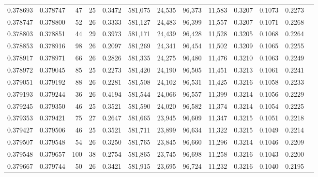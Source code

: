 \begin{tabular}{rrrrrrrrrrrrr}
0.378693 & 0.378747 &    47 &  25 &                                     0.3472 & 581,075 &  24,535 &  96,373 &  11,583 & 0.3207 & 0.1073 & 0.2273 \\
0.378747 & 0.378800 &    52 &  26 &                                     0.3333 & 581,127 &  24,483 &  96,399 &  11,557 & 0.3207 & 0.1071 & 0.2268 \\
0.378803 & 0.378851 &    44 &  29 &                                     0.3973 & 581,171 &  24,439 &  96,428 &  11,528 & 0.3205 & 0.1068 & 0.2264 \\
0.378853 & 0.378916 &    98 &  26 &                                     0.2097 & 581,269 &  24,341 &  96,454 &  11,502 & 0.3209 & 0.1065 & 0.2255 \\
0.378917 & 0.378971 &    66 &  26 &                                     0.2826 & 581,335 &  24,275 &  96,480 &  11,476 & 0.3210 & 0.1063 & 0.2249 \\
0.378972 & 0.379045 &    85 &  25 &                                     0.2273 & 581,420 &  24,190 &  96,505 &  11,451 & 0.3213 & 0.1061 & 0.2241 \\
0.379051 & 0.379192 &    88 &  26 &                                     0.2281 & 581,508 &  24,102 &  96,531 &  11,425 & 0.3216 & 0.1058 & 0.2233 \\
0.379193 & 0.379244 &    36 &  26 &                                     0.4194 & 581,544 &  24,066 &  96,557 &  11,399 & 0.3214 & 0.1056 & 0.2229 \\
0.379245 & 0.379350 &    46 &  25 &                                     0.3521 & 581,590 &  24,020 &  96,582 &  11,374 & 0.3214 & 0.1054 & 0.2225 \\
0.379353 & 0.379421 &    75 &  27 &                                     0.2647 & 581,665 &  23,945 &  96,609 &  11,347 & 0.3215 & 0.1051 & 0.2218 \\
0.379427 & 0.379506 &    46 &  25 &                                     0.3521 & 581,711 &  23,899 &  96,634 &  11,322 & 0.3215 & 0.1049 & 0.2214 \\
0.379507 & 0.379548 &    54 &  26 &                                     0.3250 & 581,765 &  23,845 &  96,660 &  11,296 & 0.3214 & 0.1046 & 0.2209 \\
0.379548 & 0.379657 &   100 &  38 &                                     0.2754 & 581,865 &  23,745 &  96,698 &  11,258 & 0.3216 & 0.1043 & 0.2200 \\
0.379667 & 0.379744 &    50 &  26 &                                     0.3421 & 581,915 &  23,695 &  96,724 &  11,232 & 0.3216 & 0.1040 & 0.2195 \\

\end{tabular}
